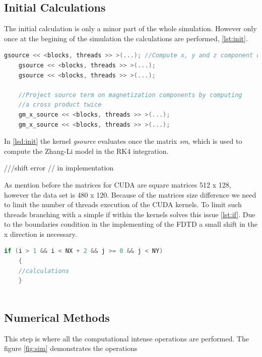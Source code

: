 \subsection{Initial Calculations}

The initial calculation is only a minor part of the whole simulation. However only once at the begining of the simulation the calculations are performed, \ref{lst:init}.

\begin{lstlisting}[language=C++, label={lst:init}, caption={Initial calculations}]
    gsource << <blocks, threads >> >(...); //Compute x, y and z component of source term
    gsource << <blocks, threads >> >(...);
    gsource << <blocks, threads >> >(...);

    //Project source term on magnetization components by computing
    //a cross product twice
    gm_x_source << <blocks, threads >> >(...);
    gm_x_source << <blocks, threads >> >(...);
\end{lstlisting}

In \ref{lsd:init} the kernel \textit{gsource} evaluates once the matrix \textit{sm}, which is used to compute the Zhang-Li model in the RK4 integration. 

///shift error
// in implementation

As mention before the matrices for CUDA are square matrices 512 x 128, however the data set is 480 x 120. Because of the matrices size difference we need to limit the number of threads execution of the CUDA kernels. To limit such threads branching with a simple if within the kernels solves this issue \ref{lst:if}. Due to the boundaries condition in the implementing of the FDTD a small shift in the x direction is necessary. 

\begin{lstlisting}[language=C++, label={lst:lpay}, caption={Laplacian X using global memory}]
    if (i > 1 && i < NX + 2 && j >= 0 && j < NY)
    {
    //calculations
    }
    
\end{lstlisting}

\subsection{Numerical Methods}

This step is where all the computational intense operations are performed. The figure \ref{fig:sim} demonstrates the operations 


